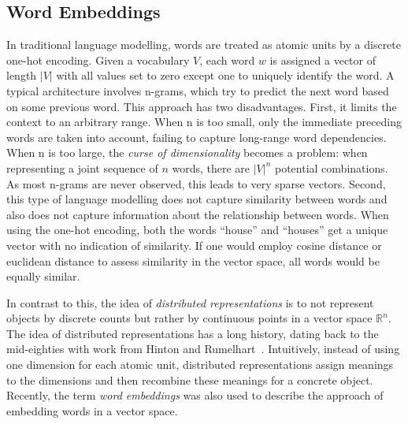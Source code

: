 \documentclass{sig-alternate-05-2015}
\begin{document}

\subsection{Word Embeddings}

In traditional language modelling, words are treated as atomic units by a discrete one-hot encoding.
Given a vocabulary $V$, each word $w$ is assigned a vector of length $|V|$ with all values set to zero except one to uniquely identify the word.
A typical architecture involves n-grams, which try to predict the next word based on some previous word.
This approach has two disadvantages.
First, it limits the context to an arbitrary range.
When n is too small, only the immediate preceding words are taken into account, failing to capture long-range word dependencies.
When n is too large, the \emph{curse of dimensionality} becomes a problem: when representing a joint sequence of $n$ words, there are $|V|^n$ potential combinations.
As most n-grams are never observed, this leads to very sparse vectors.
Second, this type of language modelling does not capture similarity between words and also does not capture information about the relationship between words.
When using the one-hot encoding, both the words ``house'' and ``houses'' get a unique vector with no indication of similarity.
If one would employ cosine distance or euclidean distance to assess similarity in the vector space, all words would be equally similar.

In contrast to this, the idea of \emph{distributed representations} is to not represent objects by discrete counts but rather by continuous points in a vector space $\mathbb{R}^n$.
The idea of distributed representations has a long history, dating back to the mid-eighties with work from Hinton and Rumelhart~\cite{Hinton1986,Rumelhart1988}.
Intuitively, instead of using one dimension for each atomic unit, distributed representations assign meanings to the dimensions and then recombine these meanings for a concrete object.
Recently, the term \emph{word embeddings} was also used to describe the approach of embedding words in a vector space.
\end{document}

